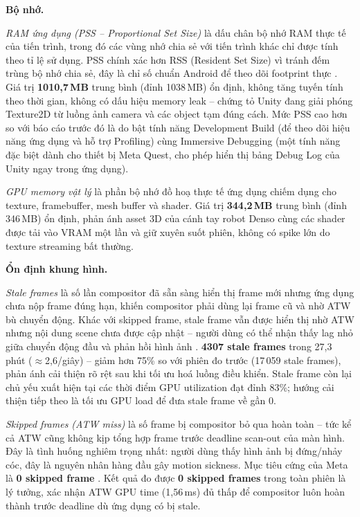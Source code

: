 \textbf{Bộ nhớ.}

\textit{RAM ứng dụng (PSS -- Proportional Set Size)} là dấu chân bộ nhớ RAM thực tế của
tiến trình, trong đó các vùng nhớ chia sẻ với tiến trình khác chỉ được tính theo tỉ lệ sử
dụng. PSS chính xác hơn RSS (Resident Set Size) vì tránh đếm trùng bộ nhớ chia sẻ, đây là
chỉ số chuẩn Android để theo dõi footprint thực \cite{android_memory_overview}. Giá trị
\textbf{1010{,}7\,MB} trung bình (đỉnh 1038\,MB) ổn định, không tăng tuyến tính theo thời gian,
không có dấu hiệu memory leak -- chứng tỏ Unity đang giải phóng Texture2D từ luồng ảnh
camera và các object tạm đúng cách. Mức PSS cao hơn so với báo cáo trước đó là do bật tính năng Development Build (để theo dõi hiệu năng ứng dụng và hỗ trợ Profiling) cùng Immersive Debugging (một tính năng đặc biệt dành cho thiết bị Meta Quest, cho phép hiển thị bảng Debug Log của Unity ngay trong ứng dụng).

\textit{GPU memory vật lý} là phần bộ nhớ đồ hoạ thực tế ứng dụng chiếm dụng cho
texture, framebuffer, mesh buffer và shader. Giá trị \textbf{344{,}2\,MB} trung bình (đỉnh
346\,MB) ổn định, phản ánh asset 3D của cánh tay robot Denso cùng các shader được tải vào
VRAM một lần và giữ xuyên suốt phiên, không có spike lớn do texture streaming bất thường.

\textbf{Ổn định khung hình.}

\textit{Stale frames} là số lần compositor đã sẵn sàng hiển thị frame mới nhưng ứng dụng
chưa nộp frame đúng hạn, khiến compositor phải dùng lại frame cũ và nhờ ATW bù chuyển động.
Khác với skipped frame, stale frame vẫn được hiển thị nhờ ATW nhưng nội dung scene chưa
được cập nhật -- người dùng có thể nhận thấy lag nhỏ giữa chuyển động đầu và phản hồi
hình ảnh \cite{meta_ovr_stats}. \textbf{4307 stale frames} trong 27{,}3 phút
($\approx$2{,}6/giây) -- giảm hơn 75\% so với phiên đo trước (17\,059 stale frames),
phản ánh cải thiện rõ rệt sau khi tối ưu hoá luồng điều khiển. Stale frame còn lại chủ yếu
xuất hiện tại các thời điểm GPU utilization đạt đỉnh 83\%; hướng cải thiện tiếp theo là
tối ưu GPU load để đưa stale frame về gần 0.

\textit{Skipped frames (ATW miss)} là số frame bị compositor bỏ qua hoàn toàn -- tức kể
cả ATW cũng không kịp tổng hợp frame trước deadline scan-out của màn hình. Đây là tình
huống nghiêm trọng nhất: người dùng thấy hình ảnh bị đứng/nhảy cóc, đây là nguyên nhân
hàng đầu gây motion sickness. Mục tiêu cứng của Meta là \textbf{0 skipped frame}
\cite{meta_ovr_stats}. Kết quả đo được \textbf{0 skipped frames} trong toàn phiên
là lý tưởng, xác nhận ATW GPU time (1{,}56\,ms) đủ thấp để compositor luôn hoàn thành
trước deadline dù ứng dụng có bị stale.

